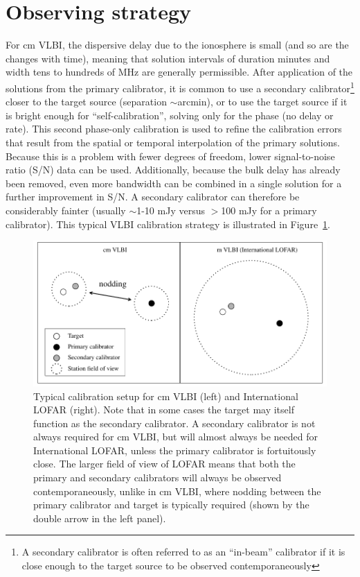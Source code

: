 \documentclass[graybox]{svmult}
\begin{document}
\section{Observing strategy}

For cm VLBI, the dispersive delay due to the ionosphere is small (and so are the
changes with time), meaning that solution intervals of duration minutes and
width tens to hundreds of MHz are generally permissible.  After application of
the solutions from the primary calibrator, it is common to use a secondary
calibrator\footnote{A secondary calibrator is often referred to as an
``in-beam'' calibrator if it is close enough to the target source to be observed
contemporaneously} closer to the target source (separation $\sim$arcmin), or to
use the target source if it is bright enough for ``self-calibration'', solving
only for the phase (no delay or rate). This second phase-only calibration is
used to refine the calibration errors that result from the spatial or temporal
interpolation of the primary solutions.  Because this is a problem with fewer
degrees of freedom, lower signal-to-noise ratio (S/N) data can be used.
Additionally, because the bulk delay has already been removed, even more
bandwidth can be combined in a single solution for a further improvement in S/N.
A secondary calibrator can therefore be considerably fainter (usually $\sim$1-10
mJy versus $>$100 mJy for a primary calibrator).  This typical VLBI calibration
strategy is illustrated in Figure~\ref{fig:calstrategy}.

\begin{figure}[] %
\center
\includegraphics[width=\textwidth]{figures/vlbi_sketch.pdf}
\caption{Typical calibration setup for cm VLBI (left) and International LOFAR
(right).  Note that in some cases the target may itself function as the
secondary calibrator.  A secondary calibrator is not always required for cm
VLBI, but will almost always be needed for International LOFAR, unless the
primary calibrator is fortuitously close.  The larger field of view of LOFAR
means that both the primary and secondary calibrators will always be observed
contemporaneously, unlike in cm VLBI, where nodding between the primary
calibrator and target is typically required (shown by the double arrow in the
left panel).}
\label{fig:calstrategy}
\end{figure}
\end{document}
